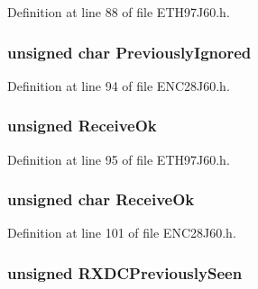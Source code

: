 Definition at line 88 of file E\+T\+H97\+J60.\+h.

\hypertarget{union_r_x_s_t_a_t_u_s_a96946cdf03b86471a38c97c177eaedd7}{}
\subsubsection[{Previously\+Ignored}]{\setlength{\rightskip}{0pt plus 5cm}unsigned char Previously\+Ignored}\label{union_r_x_s_t_a_t_u_s_a96946cdf03b86471a38c97c177eaedd7}


Definition at line 94 of file E\+N\+C28\+J60.\+h.

\hypertarget{union_r_x_s_t_a_t_u_s_a2e72fcf06350d7accc0ff2af51a8ad5a}{}
\subsubsection[{Receive\+Ok}]{\setlength{\rightskip}{0pt plus 5cm}unsigned Receive\+Ok}\label{union_r_x_s_t_a_t_u_s_a2e72fcf06350d7accc0ff2af51a8ad5a}


Definition at line 95 of file E\+T\+H97\+J60.\+h.

\hypertarget{union_r_x_s_t_a_t_u_s_a65448b6bde554c9ca1bcd416b381d103}{}
\subsubsection[{Receive\+Ok}]{\setlength{\rightskip}{0pt plus 5cm}unsigned char Receive\+Ok}\label{union_r_x_s_t_a_t_u_s_a65448b6bde554c9ca1bcd416b381d103}


Definition at line 101 of file E\+N\+C28\+J60.\+h.

\hypertarget{union_r_x_s_t_a_t_u_s_a216c38b837fc8bf391ef9e5272213ad2}{}
\subsubsection[{R\+X\+D\+C\+Previously\+Seen}]{\setlength{\rightskip}{0pt plus 5cm}unsigned R\+X\+D\+C\+Previously\+Seen}\label{union_r_x_s_t_a_t_u_s_a216c38b837fc8bf391ef9e5272213ad2}


